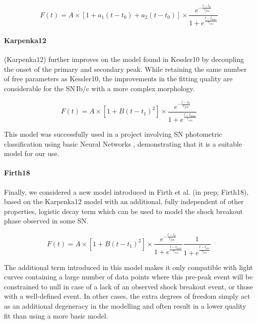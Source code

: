 \begin{equation}
  F(t) = A \times [1 + a_1(t - {t_0}) + a_2(t - {t_0})] \times \frac{e^{-\frac{t - t_{0}}{\tau_{fall}}}} {1 + e^{\frac{t - t_{max}}{\tau_{rise}}}}
\end{equation}

\paragraph{Karpenka12}
\citet{Karpenka2012} (Karpenka12) further improves on the model found in Kessler10 by decoupling the onset of the primary and secondary peak. While retaining the same number of free parameters as Kessler10, the improvements in the fitting quality are considerable for the SN\,Ib/c with a more complex morphology.

\begin{equation}
  F(t) = A \times [1 + B(t - {t_1})^2] \times \frac{e^{-\frac{t - t_{0}}{\tau_{fall}}}} {1 + e^{\frac{t - t_{max}}{\tau_{rise}}}}
\end{equation}

This model was successfully used in a project involving SN photometric classification using basic Neural Networks \citep{Karpenka2012}, demonstrating that it is a suitable model for our use.

\paragraph{Firth18}
Finally, we considered a new model introduced in Firth et al. (in prep; Firth18), based on the Karpenka12 model with an additional, fully independent of other properties, logistic decay term which can be used to model the shock breakout phase observed in some SN.

\begin{equation}
  F(t) = A \times [1 + B(t - {t_1})^2] \times \frac{e^{-\frac{t - t_{0}}{\tau_{fall}}}} {1 + e^{\frac{t - t_{max}}{\tau_{rise}}}} \frac{1}{1 + e^{\frac{t - t_{pre}}{\tau_{pre}}}}
\end{equation}

The additional term introduced in this model makes it only compatible with light curves containing a large number of data points where this pre-peak event will be constrained to null in case of a lack of an observed shock breakout event, or those with a well-defined event. In other cases, the extra degrees of freedom simply act as an additional degeneracy in the modelling and often result in a lower quality fit than using a more basic model.

